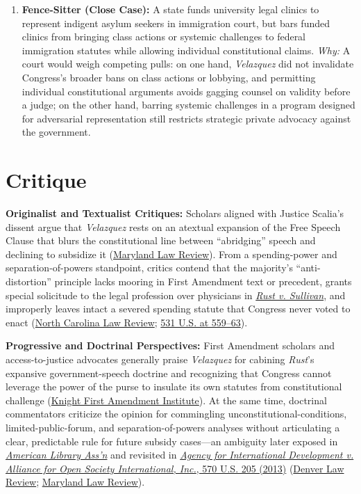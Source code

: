\documentclass[12pt]{article}
\begin{document}
\begin{enumerate}
\item \textbf{Fence-Sitter (Close Case):} A state funds university legal clinics to represent indigent asylum seekers in immigration court, but bars funded clinics from bringing class actions or systemic challenges to federal immigration statutes while allowing individual constitutional claims. \textit{Why:} A court would weigh competing pulls: on one hand, \textit{Velazquez} did not invalidate Congress's broader bans on class actions or lobbying, and permitting individual constitutional arguments avoids gagging counsel on validity before a judge; on the other hand, barring systemic challenges in a program designed for adversarial representation still restricts strategic private advocacy against the government.
\end{enumerate}

\section{Critique}
\textbf{Originalist and Textualist Critiques:} Scholars aligned with Justice Scalia's dissent argue that \textit{Velazquez} rests on an atextual expansion of the Free Speech Clause that blurs the constitutional line between ``abridging'' speech and declining to subsidize it (\href{https://digitalcommons.law.umaryland.edu/cgi/viewcontent.cgi?article=3163&context=mlr}{Maryland Law Review}). From a spending-power and separation-of-powers standpoint, critics contend that the majority's ``anti-distortion'' principle lacks mooring in First Amendment text or precedent, grants special solicitude to the legal profession over physicians in \href{https://supreme.justia.com/cases/federal/us/500/173/}{\textit{Rust v. Sullivan}}, and improperly leaves intact a severed spending statute that Congress never voted to enact (\href{https://scholarship.law.unc.edu/cgi/viewcontent.cgi?article=4047&context=nclr}{North Carolina Law Review}; \href{https://supreme.justia.com/cases/federal/us/531/533/}{531 U.S. at 559--63}).

\textbf{Progressive and Doctrinal Perspectives:} First Amendment scholars and access-to-justice advocates generally praise \textit{Velazquez} for cabining \textit{Rust}'s expansive government-speech doctrine and recognizing that Congress cannot leverage the power of the purse to insulate its own statutes from constitutional challenge (\href{https://knightcolumbia.org/content/distorting-the-press}{Knight First Amendment Institute}). At the same time, doctrinal commentators criticize the opinion for commingling unconstitutional-conditions, limited-public-forum, and separation-of-powers analyses without articulating a clear, predictable rule for future subsidy cases---an ambiguity later exposed in \href{https://supreme.justia.com/cases/federal/us/539/194/}{\textit{American Library Ass'n}} and revisited in \href{https://supreme.justia.com/cases/federal/us/570/205/}{\textit{Agency for International Development v. Alliance for Open Society International, Inc.}, 570 U.S. 205 (2013)} (\href{https://digitalcommons.du.edu/cgi/viewcontent.cgi?article=1707&context=dlr}{Denver Law Review}; \href{https://digitalcommons.law.umaryland.edu/cgi/viewcontent.cgi?article=3163&context=mlr}{Maryland Law Review}).
\end{document}
